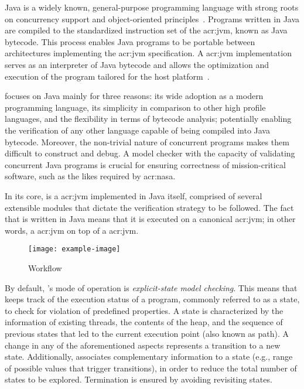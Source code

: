 Java is a widely known, general-purpose programming language with strong roots on concurrency support and object-oriented principles~\cite{Gosling2014}. Programs written in Java are compiled to the standardized instruction set of the \acrfull{acr:jvm}, known as Java bytecode. This process enables Java programs to be portable between architectures implementing the \acrshort{acr:jvm} specification. A \acrshort{acr:jvm} implementation serves as an interpreter of Java bytecode and allows the optimization and execution of the program tailored for the host platform~\cite{Lindholm2014}.

\jpf focuses on Java mainly for three reasons: its wide adoption as a modern programming language, its simplicity in comparison to other high profile languages, and the flexibility in terms of bytecode analysis; potentially enabling the verification of any other language capable of being compiled into Java bytecode. Moreover, the non-trivial nature of concurrent programs makes them difficult to construct and debug. A model checker with the capacity of validating concurrent Java programs is crucial for ensuring correctness of mission-critical software, such as the likes required by \acrshort{acr:nasa}.

In its core, \jpf is a \acrlong{acr:jvm} implemented in Java itself, comprised of several extensible modules that dictate the verification strategy to be followed. The fact that \jpf is written in Java means that it is executed on a canonical \acrshort{acr:jvm}; in other words, a \acrshort{acr:jvm} on top of a \acrshort{acr:jvm}. 

\begin{figure}[t]
\centering
\texttt{[image: example-image]}
\caption{\jpf Workflow}
\label{fig:jpf:process}
\end{figure}

By default, \jpf's mode of operation is \textit{explicit-state model checking}. This means that \jpf keeps track of the execution status of a program, commonly referred to as a state, to check for violation of predefined properties. A state is characterized by the information of existing threads, the contents of the heap, and the sequence of previous states that led to the current execution point (also known as path). A change in any of the aforementioned aspects represents a transition to a new state. Additionally, \jpf associates complementary information to a state (e.g., range of possible values that trigger transitions), in order to reduce the total number of states to be explored. Termination is ensured by avoiding revisiting states.

